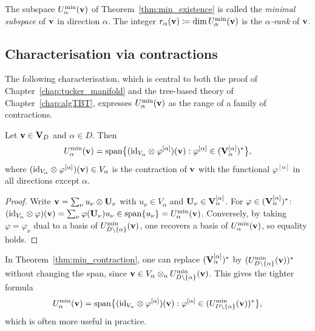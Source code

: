 \begin{definition}
\label{def:minimal_subspace}
The subspace $U^{\min}_{\alpha}(\mathbf{v})$ of Theorem~\ref{thm:min_existence}
is called the \emph{minimal subspace} of $\mathbf{v}$ in direction $\alpha$.
The integer $r_\alpha(\mathbf{v}) \coloneqq \dim U^{\min}_{\alpha}(\mathbf{v})$ is the
\emph{$\alpha$-rank} of $\mathbf{v}$.
\end{definition}

\subsection*{Characterisation via contractions}

The following characterisation, which is central to both the proof of
Chapter~\ref{chap:tucker_manifold} and the tree-based theory of
Chapter~\ref{chap:algTBT}, expresses $U^{\min}_{\alpha}(\mathbf{v})$ as the
range of a family of contractions.

\begin{theorem}
\label{thm:min_contraction}
Let $\mathbf{v} \in \mathbf{V}_D$ and $\alpha \in D$. Then
\begin{equation}
\label{eq:min_contraction}
    U^{\min}_{\alpha}(\mathbf{v})
    = \mathrm{span}\bigl\{
        (\mathrm{id}_{V_\alpha} \otimes \varphi^{[\alpha]})(\mathbf{v}) :
        \varphi^{[\alpha]} \in (\mathbf{V}_\alpha^{[\alpha]})^*
      \bigr\},
\end{equation}
where $(\mathrm{id}_{V_\alpha} \otimes \varphi^{[\alpha]})(\mathbf{v}) \in V_\alpha$
is the contraction of $\mathbf{v}$ with the functional $\varphi^{[\alpha]}$
in all directions except $\alpha$.
\end{theorem}

\begin{proof}
Write $\mathbf{v} = \sum_\nu u_\nu \otimes \mathbf{U}_\nu$ with $u_\nu \in V_\alpha$
and $\mathbf{U}_\nu \in \mathbf{V}_\alpha^{[\alpha]}$. For $\varphi \in
(\mathbf{V}_\alpha^{[\alpha]})^*$:
$(\mathrm{id}_{V_\alpha} \otimes \varphi)(\mathbf{v}) = \sum_\nu \varphi(\mathbf{U}_\nu) u_\nu
\in \mathrm{span}\{u_\nu\} = U^{\min}_{\alpha}(\mathbf{v})$. Conversely, by taking
$\varphi = \varphi_\nu$ dual to a basis of $U^{\min}_{D\setminus\{\alpha\}}(\mathbf{v})$,
one recovers a basis of $U^{\min}_{\alpha}(\mathbf{v})$, so equality holds.
\end{proof}

\begin{remark}
\label{rem:min_replacement}
In Theorem~\ref{thm:min_contraction}, one can replace
$(\mathbf{V}_\alpha^{[\alpha]})^*$ by $(U^{\min}_{D\setminus\{\alpha\}}(\mathbf{v}))^*$
without changing the span, since $\mathbf{v} \in V_\alpha \otimes_a
U^{\min}_{D\setminus\{\alpha\}}(\mathbf{v})$. This gives the tighter formula
\begin{equation}
\label{eq:min_contraction_minimal}
    U^{\min}_{\alpha}(\mathbf{v})
    = \mathrm{span}\bigl\{
        (\mathrm{id}_{V_\alpha} \otimes \varphi^{[\alpha]})(\mathbf{v}) :
        \varphi^{[\alpha]} \in (U^{\min}_{D\setminus\{\alpha\}}(\mathbf{v}))^*
      \bigr\},
\end{equation}
which is often more useful in practice.
\end{remark}


